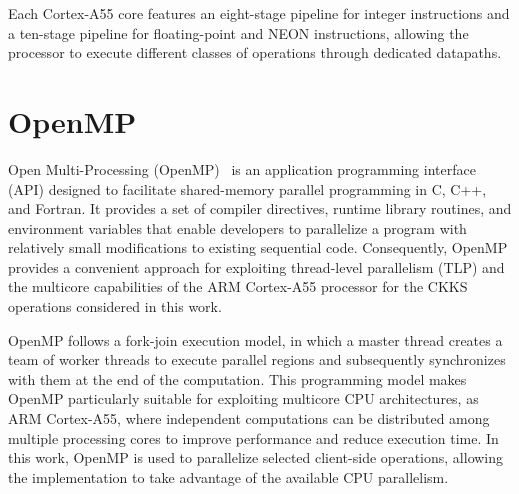 Each Cortex-A55 core features an eight-stage pipeline for integer instructions and a ten-stage pipeline for floating-point and NEON instructions, allowing the processor to execute different classes of operations through dedicated datapaths. %


\section{OpenMP}

Open Multi-Processing (OpenMP)~\cite{openmp} is an application programming interface (API) designed to facilitate shared-memory parallel programming in C, C++, and Fortran. It provides a set of compiler directives, runtime library routines, and environment variables that enable developers to parallelize a program with relatively small modifications to existing sequential code. Consequently, OpenMP provides a convenient approach for exploiting thread-level parallelism (TLP) and the multicore capabilities of the ARM Cortex-A55 processor for the CKKS operations considered in this work.

OpenMP follows a fork-join execution model, in which a master thread creates a team of worker threads to execute parallel regions and subsequently synchronizes with them at the end of the computation. This programming model makes OpenMP particularly suitable for exploiting multicore CPU architectures, as ARM Cortex-A55, where independent computations can be distributed among multiple processing cores to improve performance and reduce execution time. In this work, OpenMP is used to parallelize selected client-side operations, allowing the implementation to take advantage of the available CPU parallelism.

